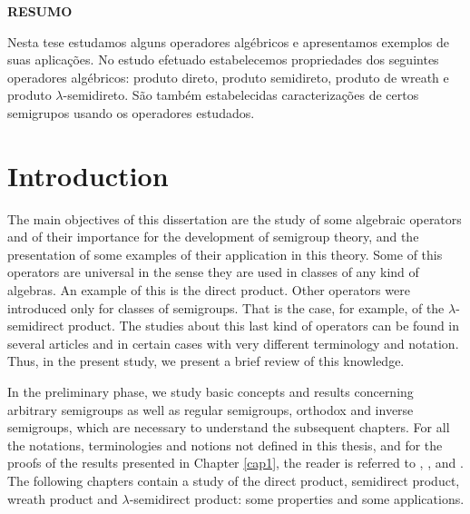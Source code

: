 \documentclass[12pt,a4paper,twoside]{report}
\theoremstyle{remark}
\theoremstyle{example}
\begin{document}
\newpage
\thispagestyle{empty}
\null

\newpage\noindent\textbf{RESUMO}

\strut

Nesta tese estudamos alguns operadores algébricos e apresentamos exemplos de suas aplicações. No estudo efetuado estabelecemos propriedades dos seguintes operadores algébricos: produto direto, produto semidireto, produto de wreath e produto $\lambda$-semidireto. São também estabelecidas caracterizações de certos semigrupos usando os operadores estudados.

\newpage
\thispagestyle{empty}
\null


\newpage
\tableofcontents



\newpage
{}
\setcounter{page}{1}
\chapter*{Introduction}

The main objectives of this dissertation are the study of some algebraic operators and of their importance for the development of semigroup theory, and the presentation of some examples of their application in this theory. Some of this operators are universal in the sense they are used in classes of any kind of algebras. An example of this is the direct product. Other operators were introduced only for classes of semigroups. That is the case, for example, of the $\lambda$-semidirect product. The studies about this last kind of operators can be found in several articles and in certain cases with very different terminology and notation. Thus, in the present study, we present a brief review of this knowledge.

In the preliminary phase, we study basic concepts and results concerning arbitrary semigroups as well as regular semigroups, orthodox and inverse semigroups, which are necessary to understand the subsequent chapters. For all the notations, terminologies and notions not defined in
this thesis, and for the proofs of the results presented in Chapter \ref{cap1}, the reader is referred to \cite{5}, \cite{4}, \cite{2} and \cite{3}. The following chapters contain a study of the direct product, semidirect product, wreath product and $\lambda$-semidirect product: some properties and some applications.

\newpage
\thispagestyle{empty}
\null
\end{document}
